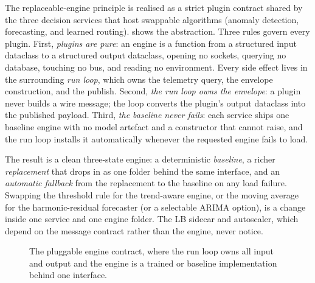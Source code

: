 The replaceable-engine principle is realised as a strict plugin contract shared
by the three decision services that host swappable algorithms (anomaly
detection, forecasting, and learned routing).  shows the
abstraction. Three rules govern every plugin. First, \emph{plugins are pure}: an
engine is a function from a structured input dataclass to a structured output
dataclass, opening no sockets, querying no database, touching no bus, and
reading no environment. Every side effect lives in the surrounding \emph{run
loop}, which owns the telemetry query, the envelope construction, and the
publish. Second, \emph{the run loop owns the envelope}: a plugin never builds a
wire message; the loop converts the plugin's output dataclass into the published
payload. Third, \emph{the baseline never fails}: each service ships one baseline
engine with no model artefact and a constructor that cannot raise, and the run
loop installs it automatically whenever the requested engine fails to load.

The result is a clean three-state engine: a deterministic \emph{baseline}, a
richer \emph{replacement} that drops in as one folder behind the same interface,
and an \emph{automatic fallback} from the replacement to the baseline on any load
failure. Swapping the threshold rule for the trend-aware engine, or the moving
average for the harmonic-residual forecaster (or a selectable ARIMA
\cite{box2015timeseries} option), is a change inside one service and one engine
folder. The LB sidecar and autoscaler, which depend on the message contract rather
than the engine, never notice.

\begin{figure}[H]
\centering
{}
\caption[The pluggable engine contract]{The pluggable engine contract, where the run loop owns all input and output and the engine is a trained or baseline implementation behind one interface.}
\label{fig:dsb:engine}
\end{figure}

